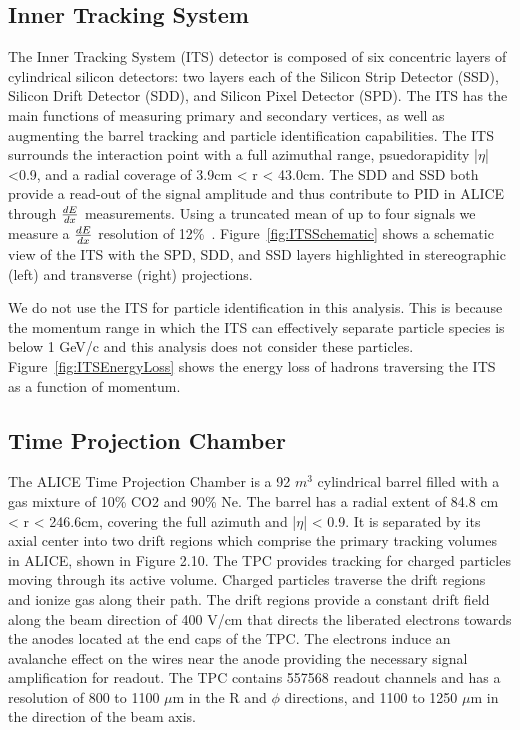 \subsection{Inner Tracking System}

The Inner Tracking System (ITS) detector is composed of six concentric layers of cylindrical silicon detectors: two layers each of the Silicon Strip Detector (SSD), Silicon Drift Detector (SDD), and Silicon Pixel Detector (SPD). The ITS has the main functions of measuring primary and secondary vertices, as well as augmenting the barrel tracking and particle identification capabilities. The ITS surrounds the interaction point with a full azimuthal range, psuedorapidity |$\eta$| <0.9, and a radial coverage of 3.9cm < r < 43.0cm. The SDD and SSD both provide a read-out of the signal amplitude and thus contribute to PID in ALICE through $\frac{dE}{dx}$ measurements. Using a truncated mean of up to four signals we measure a $\frac{dE}{dx}$ resolution of 12\%~\cite{}. Figure~\ref{fig:ITSSchematic} shows a schematic view of the ITS with the SPD, SDD, and SSD layers highlighted in stereographic (left) and transverse (right) projections.

We do not use the ITS for particle identification in this analysis. This is because the momentum range in which the ITS can effectively separate particle species is below 1 GeV/c and this analysis does not consider these particles. Figure~\ref{fig:ITSEnergyLoss} shows the energy loss of hadrons traversing the ITS as a function of momentum.

\subsection{Time Projection Chamber}\label{subsec:TPC}

The ALICE Time Projection Chamber is a 92 $m^3$ cylindrical barrel filled with a gas mixture of 10\% CO2 and 90\% Ne. The barrel has a radial extent of 84.8 cm < r < 246.6cm, covering the full azimuth and |$\eta$| < 0.9. It is separated by its axial center into two drift regions which comprise the primary tracking volumes in ALICE, shown in Figure 2.10. The TPC provides tracking for charged particles moving through its active volume. Charged particles traverse the drift regions and ionize gas along their path. The drift regions provide a constant drift field along the beam direction of 400 V/cm that directs the liberated electrons towards the anodes located at the end caps of the TPC. The electrons induce an avalanche effect on the wires near the anode providing the necessary signal amplification for readout. The TPC contains 557568 readout channels and has a resolution of 800 to 1100 $\mu$m in the R and $\phi$ directions, and 1100 to 1250 $\mu$m in the direction of the beam axis. 

